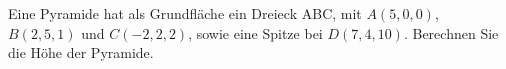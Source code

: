 \begin{ExerciseBlock}
Eine Pyramide hat als Grundfläche ein Dreieck ABC, mit $A(5,0,0)$, $B(2,5,1)$ und $C(-2,2,2)$, sowie eine Spitze bei $D(7,4,10)$. Berechnen Sie die Höhe der Pyramide.

\end{ExerciseBlock}
